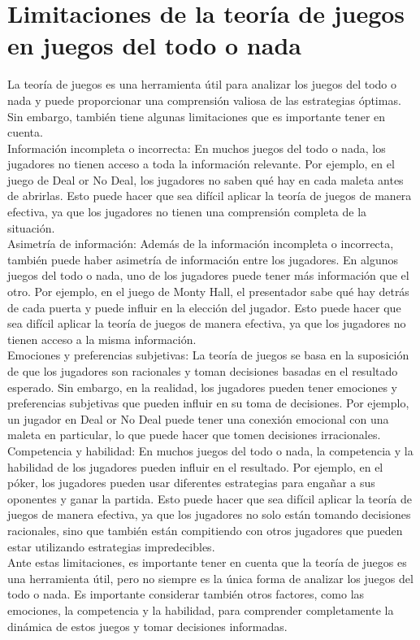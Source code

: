 \section{Limitaciones de la teoría de juegos en juegos del todo o nada}

La teoría de juegos es una herramienta útil para analizar los juegos del todo o nada y puede 
proporcionar una comprensión valiosa de las estrategias óptimas. Sin embargo, 
también tiene algunas limitaciones que es importante tener en cuenta.\\

Información incompleta o incorrecta: En muchos juegos del todo o nada, los jugadores 
no tienen acceso a toda la información relevante. Por ejemplo, en el juego de Deal or No Deal, 
los jugadores no saben qué hay en cada maleta antes de abrirlas. Esto puede hacer que sea difícil 
aplicar la teoría de juegos de manera efectiva, ya que los jugadores no tienen una comprensión 
completa de la situación.\\

Asimetría de información: Además de la información incompleta o incorrecta, también puede haber 
asimetría de información entre los jugadores. En algunos juegos del todo o nada, uno de los 
jugadores puede tener más información que el otro. Por ejemplo, en el juego de Monty Hall, 
el presentador sabe qué hay detrás de cada puerta y puede influir en la elección del jugador. 
Esto puede hacer que sea difícil aplicar la teoría de juegos de manera efectiva, ya que los jugadores 
no tienen acceso a la misma información.\\

Emociones y preferencias subjetivas: La teoría de juegos se basa en la suposición de que los 
jugadores son racionales y toman decisiones basadas en el resultado esperado. 
Sin embargo, en la realidad, los jugadores pueden tener emociones y preferencias subjetivas 
que pueden influir en su toma de decisiones. Por ejemplo, un jugador en Deal or No Deal puede 
tener una conexión emocional con una maleta en particular, lo que puede hacer que tomen decisiones 
irracionales.\\

Competencia y habilidad: En muchos juegos del todo o nada, la competencia y la habilidad de los 
jugadores pueden influir en el resultado. Por ejemplo, en el póker, los jugadores pueden usar 
diferentes estrategias para engañar a sus oponentes y ganar la partida. Esto puede hacer que sea 
difícil aplicar la teoría de juegos de manera efectiva, ya que los jugadores no solo están tomando 
decisiones racionales, sino que también están compitiendo con otros jugadores que pueden estar 
utilizando estrategias impredecibles.\\

Ante estas limitaciones, es importante tener en cuenta que la teoría de juegos es una herramienta 
útil, pero no siempre es la única forma de analizar los juegos del todo o nada. 
Es importante considerar también otros factores, como las emociones, la competencia y la habilidad, 
para comprender completamente la dinámica de estos juegos y tomar decisiones informadas.\\

